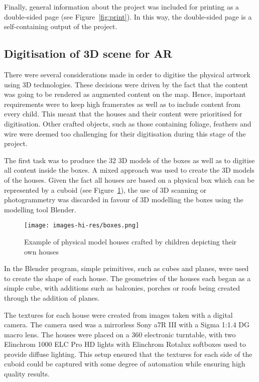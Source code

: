 \documentclass{egpubl}
\begin{document}
Finally, general information about the project was included for printing as a
double-sided page (see Figure~\ref{fig:print}). In this way, the double-sided
page is a self-containing output of the project.



\subsection{Digitisation of 3D scene for AR} There were several considerations
made in order to digitise the physical artwork using 3D technologies. These
decisions were driven by the fact that the content was going to be rendered as
augmented content on the map. Hence, important requirements were to keep high
framerates as well as to include content from every child. This meant that the
houses and their content were prioritised for digitisation. Other crafted objects, 
such as those containing foliage, feathers and wire were deemed too challenging 
for their digitisation during this stage of the project.

The first task was to produce the 32 3D models of the boxes as well as to
digitise all content inside the boxes. A mixed approach was used to create the
3D models of the houses. Given the fact all houses are based on a physical box
which can be represented by a cuboid (see Figure~\ref{fig:boxes}), the use of
3D scanning or photogrammetry was discarded in favour of 3D modelling the
boxes using the modelling tool Blender\cite{blender}. 


\begin{figure}[ht] \centering
\texttt{[image: images-hi-res/boxes.png]} \caption{Example
of physical model houses crafted by children depicting their own houses}
\label{fig:boxes} \end{figure}

In the Blender program, simple primitives, such as cubes and planes, were used
to create the shape of each house. The geometries of the houses each began as
a simple cube, with additions such as balconies, porches or roofs being
created through the addition of planes.


The textures for each house were created from images taken with a digital
camera. The camera used was a mirrorless Sony a7R III with a Sigma 1:1.4 DG
macro lens. The houses were placed on a 360 electronic turntable, with two
Elinchrom 1000 ELC Pro HD lights with Elinchrom Rotalux softboxes used to
provide diffuse lighting. This setup ensured that the textures for each side
of the cuboid could be captured with some degree of automation while ensuring
high quality results.
 
\end{document}
